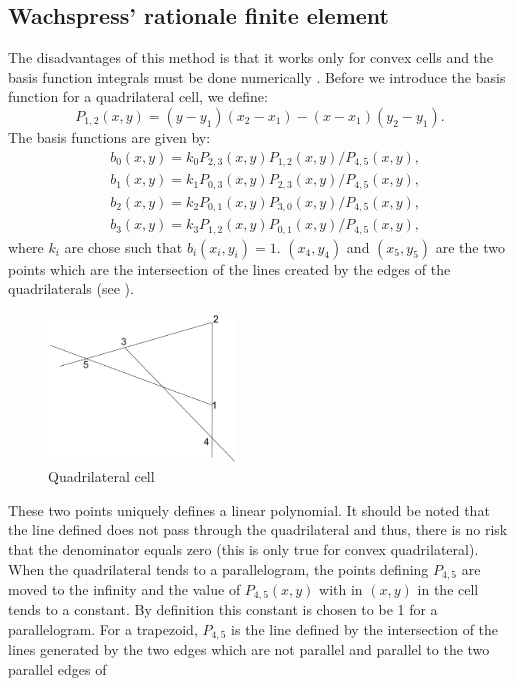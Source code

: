 \subsection{Wachspress' rationale finite element}
The disadvantages of this method is that it works only for convex cells and
the basis function integrals must be done numerically \cite{Bailey2008a}.
Before we introduce the basis function for a quadrilateral cell, we define:
\begin{equation}
  P_{1,2}(x,y) = (y-y_1) (x_2-x_1)-(x-x_1)(y_2-y_1).
\end{equation}  
The basis functions are given by:
\begin{align}
  &b_0(x,y) = k_0 P_{2,3}(x,y)P_{1,2}(x,y)/P_{4,5}(x,y),\\
  &b_1(x,y) = k_1 P_{0,3}(x,y)P_{2,3}(x,y)/P_{4,5}(x,y),\\
  &b_2(x,y) = k_2 P_{0,1}(x,y)P_{3,0}(x,y)/P_{4,5}(x,y),\\
  &b_3(x,y) = k_3 P_{1,2}(x,y)P_{0,1}(x,y)/P_{4,5}(x,y),
\end{align}
where $k_i$ are chose such that $b_i(x_i,y_i)=1$. $(x_4,y_4)$ and $(x_5,y_5)$
are the two points which are the intersection of the lines created by the edges of the
quadrilaterals (see ).
\begin{figure}[H]
  \centering
  \includegraphics[width=5cm]{quadrilateral}
  \caption{Quadrilateral cell}
  \label{fig_quadrilateral}
\end{figure}
These two points uniquely defines a linear polynomial. It
should be noted that the line defined does not pass through the quadrilateral
and thus, there is no risk that the denominator equals zero (this is only true
for convex quadrilateral). When the quadrilateral tends to a parallelogram,
the points defining $P_{4,5}$ are moved to the infinity and the value of
$P_{4,5}(x,y)$ with in $(x,y)$ in the cell tends to a constant. By definition
this constant is chosen to be 1 for a parallelogram. For a trapezoid,
$P_{4,5}$ is the line defined by the intersection of the lines generated by
the two edges which are not parallel and parallel to the two parallel edges of
